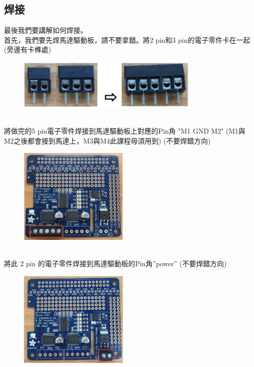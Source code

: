 \documentclass{article}
\begin{document}
\subsection{焊接}
最後我們要講解如何焊接。
\\首先，我們要先焊馬達驅動板，請不要拿錯。將2 pin和3 pin的電子零件卡在一起(旁邊有卡榫處)
\\
\begin{figure}[htp]
    \begin{center}
        \includegraphics[width=250pt]{pic/1_1_6.png}
    \end{center}
\end{figure}
\\
將做完的5 pin電子零件焊接到馬達驅動板上對應的Pin角 "M1 GND M2" (M1與M2之後都會接到馬達上，M3與M4此課程毋須用到) (不要焊錯方向)
\\
\begin{figure}[htp]
    \begin{center}
        \includegraphics[width=150pt]{pic/1_1_7.png}
    \end{center}
\end{figure}
\\
將此 2 pin 的電子零件焊接到馬達驅動板的Pin角”power” (不要焊錯方向)
\\
\begin{figure}[htp]
    \begin{center}
        \includegraphics[width=150pt]{pic/1_1_8.png}
    \end{center}
\end{figure}
\end{document}
